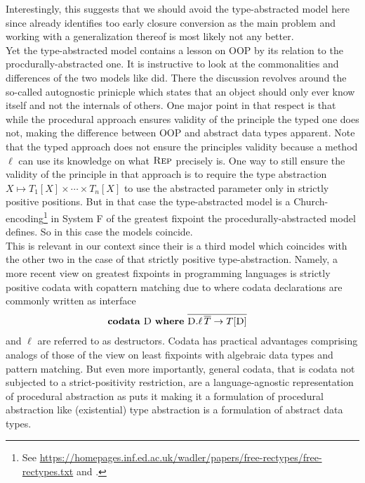 Interestingly, this suggests that we should avoid the type-abstracted model here since \cite{thorin} already identifies too early closure conversion as the main problem and working with a generalization thereof is most likely not any better.
\\
Yet the type-abstracted model contains a lesson on OOP by its relation to the procdurally-abstracted one.
It is instructive to look at the commonalities and differences of the two models like \cite{cook09understanding} did.
There the discussion revolves around the so-called {\glqq}autognostic prinicple{\grqq} which states that an object should only ever know itself and not the internals of others.
One major point in that respect is that while the procedural approach ensures validity of the principle the typed one does not, making the difference between OOP and abstract data types apparent.
Note that the typed approach does not ensure the principles validity because a method $\ell$ can use its knowledge on what $\textsc{Rep}$ precisely is.
One way to still ensure the validity of the principle in that approach is to require the type abstraction $X \mapsto T_{1}[X] \times \cdots \times T_{n}[X]$ to use the abstracted parameter only in strictly positive positions.
But in that case the type-abstracted model is a Church-encoding\footnote{See \href{https://homepages.inf.ed.ac.uk/wadler/papers/free-rectypes/free-rectypes.txt}{https://homepages.inf.ed.ac.uk/wadler/papers/free-rectypes/free-rectypes.txt} and \cite{387458b4}.} in System F of the greatest fixpoint the procedurally-abstracted model defines.
So in this case the models coincide.
\\
This is relevant in our context since their is a third model which coincides with the other two in the case of that strictly positive type-abstraction.
Namely, a more recent view on greatest fixpoints in programming languages is strictly positive codata with copattern matching due to \cite{abel13copatterns} where codata declarations are commonly written as interface
\begin{align*}
  &
  \mathbf{codata}\
  \textsc{D}\
  \mathbf{where}\
  \overline{\textsc{D}.\ell\,\overline{T} \to T[\textsc{D}]}
\end{align*}
and $\ell$ are referred to as destructors.
Codata has practical advantages comprising analogs of those of the view on least fixpoints with algebraic data types and pattern matching.
But even more importantly, general codata, that is codata not subjected to a strict-positivity restriction, are a {\glqq}language-agnostic representation of procedural abstraction{\grqq} as \cite{downen2019codata} puts it making it a formulation of procedural abstraction like (existential) type abstraction is a formulation of abstract data types.
